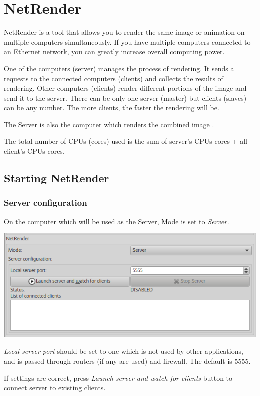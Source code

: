 \section{NetRender}\label{netrender}

NetRender is a tool that allows you to render the same image or animation on
multiple computers simultaneously. If you have multiple computers connected to
an Ethernet network, you can greatly increase overall computing power.

One of the computers (server) manages the process of rendering. It sends a
requests to the connected computers (clients) and collects the results of
rendering. Other computers (clients) render different portions of the image and
send it to the server. There can be only one server (master) but clients
(slaves) can be any number. The more clients, the faster the rendering will be.

The Server is also the computer which renders the combined image .

The total number of CPUs (cores) used is the sum of server's CPUs cores + all
client's CPUs cores.

\subsection{Starting NetRender}\label{starting-netrender}

\subsubsection{Server configuration}\label{server-configuration}

On the computer which will be used as the Server, Mode is set to \emph{Server.}

\includegraphics[width=0.7\linewidth]{img/manual/media/netrender_server.png}

\emph{Local server port} should be set to one which is not used by other
applications, and is passed through routers (if any are used) and firewall. The
default is 5555.

If settings are correct, press \emph{Launch server and watch for clients} button
to connect server to existing clients.

